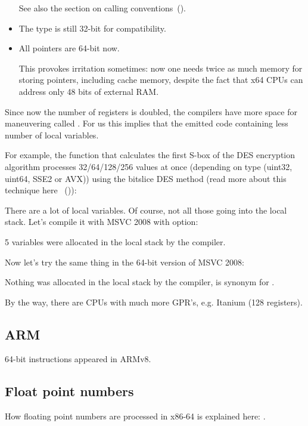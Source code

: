 \begin{itemize}
See also the section on calling conventions~().

\item
The \CCpp \Tint type is still 32-bit for compatibility.

\item
All pointers are 64-bit now.

This provokes irritation sometimes: now one needs twice as much memory for storing pointers,
including cache memory, despite the fact that x64 \ac{CPU}s can address only 48 bits of external 
\ac{RAM}.

\end{itemize}


Since now the number of registers is doubled, the compilers have more space for maneuvering called 
.
For us this implies that the emitted code containing less number of local variables.


For example, the function that calculates the first S-box of the DES encryption algorithm processes
32/64/128/256 values at once (depending on  type (uint32, uint64, SSE2 or AVX)) 
using the bitslice DES method
(read more about this technique here ~()):



There are a lot of local variables. 
Of course, not all those going into the local stack.
Let's compile it with MSVC 2008 with  option:



5 variables were allocated in the local stack by the compiler.

Now let's try the same thing in the 64-bit version of MSVC 2008:



Nothing was allocated in the local stack by the compiler,  is synonym for .

\iffalse

By the way, we can see here that the function saved the \RCX and \RDX registers in space allocated by the \gls{caller},
but \Reg{8} and \Reg{9} were not saved but used from the beginning.
\fi

By the way, there are CPUs with much more \ac{GPR}'s, e.g. Itanium (128 registers).

\subsection{ARM}

64-bit instructions appeared in ARMv8.

\subsection{Float point numbers}

How floating point numbers are processed in x86-64 is explained here: .
